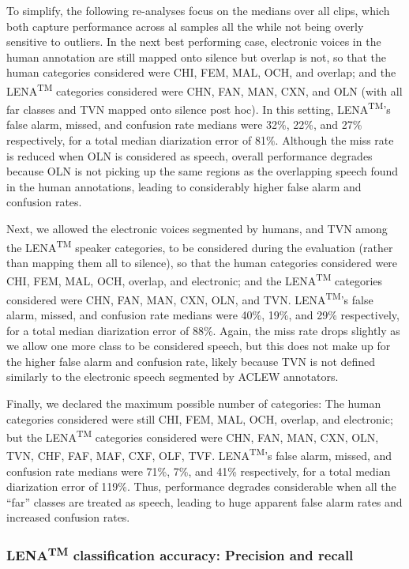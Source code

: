 \documentclass[english,floatsintext,man]{apa6}
\begin{document}
To simplify, the following re-analyses focus on the medians over all
clips, which both capture performance across al samples all the while
not being overly sensitive to outliers. In the next best performing
case, electronic voices in the human annotation are still mapped onto
silence but overlap is not, so that the human categories considered were
CHI, FEM, MAL, OCH, and overlap; and the LENA\textsuperscript{TM}
categories considered were CHN, FAN, MAN, CXN, and OLN (with all far
classes and TVN mapped onto silence post hoc). In this setting,
LENA\textsuperscript{TM}'s false alarm, missed, and confusion rate
medians were 32\%, 22\%, and 27\% respectively, for a total median
diarization error of 81\%. Although the miss rate is reduced when OLN is
considered as speech, overall performance degrades because OLN is not
picking up the same regions as the overlapping speech found in the human
annotations, leading to considerably higher false alarm and confusion
rates.

Next, we allowed the electronic voices segmented by humans, and TVN
among the LENA\textsuperscript{TM} speaker categories, to be considered
during the evaluation (rather than mapping them all to silence), so that
the human categories considered were CHI, FEM, MAL, OCH, overlap, and
electronic; and the LENA\textsuperscript{TM} categories considered were
CHN, FAN, MAN, CXN, OLN, and TVN. LENA\textsuperscript{TM}'s false
alarm, missed, and confusion rate medians were 40\%, 19\%, and 29\%
respectively, for a total median diarization error of 88\%. Again, the
miss rate drops slightly as we allow one more class to be considered
speech, but this does not make up for the higher false alarm and
confusion rate, likely because TVN is not defined similarly to the
electronic speech segmented by ACLEW annotators.

Finally, we declared the maximum possible number of categories: The
human categories considered were still CHI, FEM, MAL, OCH, overlap, and
electronic; but the LENA\textsuperscript{TM} categories considered were
CHN, FAN, MAN, CXN, OLN, TVN, CHF, FAF, MAF, CXF, OLF, TVF.
LENA\textsuperscript{TM}'s false alarm, missed, and confusion rate
medians were 71\%, 7\%, and 41\% respectively, for a total median
diarization error of 119\%. Thus, performance degrades considerable when
all the \enquote{far} classes are treated as speech, leading to huge
apparent false alarm rates and increased confusion rates.

\subsubsection{\texorpdfstring{LENA\textsuperscript{TM} classification
accuracy: Precision and
recall}{LENATM classification accuracy: Precision and recall}}\label{lenatm-classification-accuracy-precision-and-recall}
\end{document}
